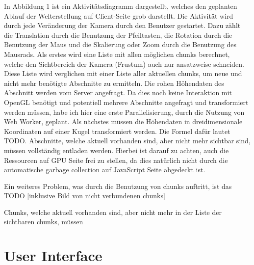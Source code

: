 In Abbildung 1 ist ein Aktivitätsdiagramm dargestellt, welches den geplanten Ablauf der Welterstellung auf Client-Seite grob darstellt. Die Aktivität wird durch jede Veränderung der Kamera durch den Benutzer gestartet. Dazu zählt die Translation durch die Benutzung der Pfeiltasten, die Rotation durch die Benutzung der Maus und die Skalierung oder Zoom durch die Benutzung des Mausrads. Als erstes wird eine Liste mit allen möglichen chunks berechnet, welche den Sichtbereich der Kamera (Frustum) auch nur ansatzweise schneiden. Diese Liste wird verglichen mit einer Liste aller aktuellen chunks, um neue und nicht mehr benötigte Abschnitte zu ermitteln. Die rohen Höhendaten des Abschnitt werden vom Server angefragt. Da dies noch keine Interaktion mit OpenGL benötigt und potentiell mehrere Abschnitte angefragt und transformiert werden müssen, habe ich hier eine erste Parallelisierung, durch die Nutzung von Web Worker, geplant. Als nächstes müssen die Höhendaten in dreidimensionale Koordinaten auf einer Kugel transformiert werden. Die Formel dafür lautet TODO. Abschnitte, welche aktuell vorhanden sind, aber nicht mehr sichtbar sind, müssen vollständig entladen werden. Hierbei ist darauf zu achten, auch die Ressourcen auf GPU Seite frei zu stellen, da dies natürlich nicht durch die automatische garbage collection auf JavaScript Seite abgedeckt ist. 

Ein weiteres Problem, was durch die Benutzung von chunks auftritt, ist das TODO [inklusive Bild von nicht verbundenen chunks]


Chunks, welche aktuell vorhanden sind, aber nicht mehr in der Liste der sichtbaren chunks, müssen 


\section{User Interface}
